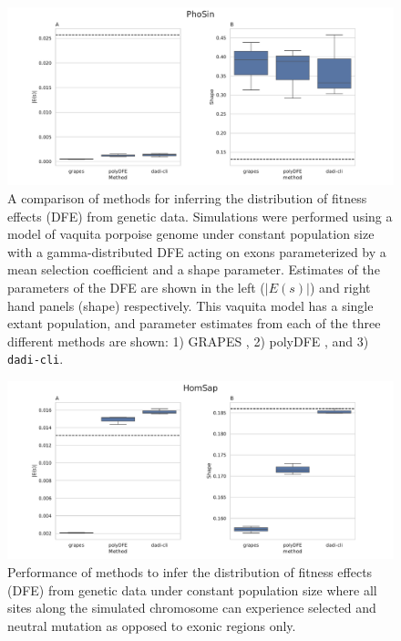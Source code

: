 \documentclass[hidelinks]{article}
\newcommand{\dadicli}{\texttt{dadi-cli}\xspace}
\begin{document}
\begin{figure}
    \centering
    \includegraphics[width=\textwidth]{figures/PhoSin/Constant/PhoSin_Constant_Gamma_R22_Phocoena_sinus.mPhoSin1.pri.110_exons_DFE_plot.pdf}
    \caption{
    \label{fig:vaquita-dfe.constant}
    A comparison of methods for inferring the distribution of fitness effects (DFE) from genetic data.
    Simulations were performed using a model of vaquita porpoise genome under constant population size with a gamma-distributed DFE
    acting on exons parameterized by a mean selection coefficient and a shape parameter. Estimates of the 
    parameters of the DFE are shown in the left ($\lvert E(s) \rvert $) and right hand panels (shape) respectively.
    This vaquita model has a single extant population, and parameter estimates from each
    of the three different methods are shown: 1) GRAPES \citep{galtier2016adaptive}, 2) polyDFE \citep{tataru2020polydfe},
    and 3) \dadicli \citep{Huang2023}.}
\end{figure}

\begin{figure}[h]
    \centering
    \includegraphics[width=\textwidth]{figures/HomSap/Constant/HomSap_Constant_Gamma_K17_all_sites_DFE_plot}
    \caption{
    \label{fig:homsap-dfe.constant.all_sites}
    Performance of methods to infer the distribution of fitness effects (DFE) from genetic data
    under constant population size  where all sites along the simulated chromosome can experience selected and neutral mutation
    as opposed to exonic regions only.
    }
\end{figure}
\end{document}
